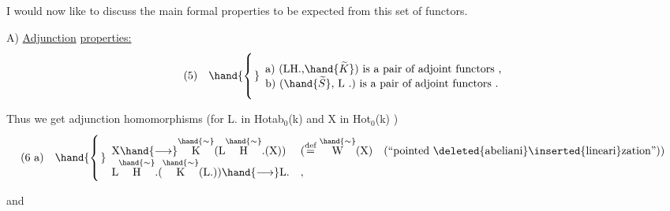 I would now like to discuss the main formal properties to be expected
from this set of functors.

A) \uline{Adjunction} \uline{properties:}
\[
(5)\quad \hand{\left\{\rule{0pt}{2.5em}\right.}
\begin{array}{l}
\text{a) (LH.,}\hand{\widetilde{K}}\text{) is a pair of adjoint functors ,}\\
\text{b) (}\hand{\widetilde{S}}\text{, L\ .) is a pair of adjoint functors .}
\end{array}
\]

Thus we get adjunction homomorphisms (for L. in Hotab$_0$(k) and X
in Hot$_0$(k) )
\[
(6\ \text{a})\quad \hand{\left\{\rule{0pt}{2.5em}\right.}
\begin{array}{ll}
\text{X} \hand{\longrightarrow} \overset{\hand{\sim}}{\text{K}}(\text{L}\overset{\hand{\sim}}{\text{H}}.(\text{X})) & (\overset{\text{def}}{=} \overset{\hand{\sim}}{\text{W}}(\text{X}) \quad (\text{``pointed }\deleted{\text{abeliani}}\inserted{\text{lineari}}\text{zation''}))\\
\text{L}\overset{\hand{\sim}}{\text{H}}.(\overset{\hand{\sim}}{\text{K}}(\text{L.})) \hand{\longrightarrow} \text{L.} & ,
\end{array}
\]

and



